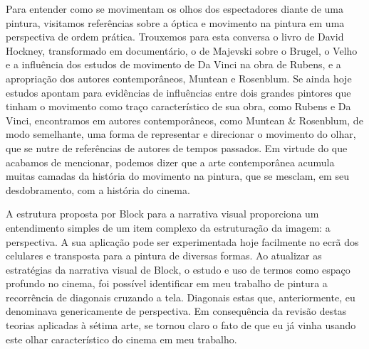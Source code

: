 Para entender como se movimentam os olhos dos espectadores diante de
uma pintura, visitamos referências sobre a óptica e movimento na
pintura em uma perspectiva de ordem prática. Trouxemos para esta
conversa o livro de David Hockney, transformado em documentário, o de
Majevski sobre o Brugel, o Velho e a influência dos estudos de
movimento de Da Vinci na obra de Rubens, e a apropriação dos autores
contemporâneos, Muntean e Rosenblum. Se ainda hoje estudos apontam para
evidências de influências entre dois grandes pintores que tinham o
movimento como traço característico de sua obra, como Rubens e Da
Vinci, encontramos em autores contemporâneos, como Muntean \& Rosenblum,
de modo semelhante, uma forma de representar e direcionar o movimento
do olhar, que se nutre de referências de autores de tempos passados. Em
virtude do que acabamos de mencionar, podemos dizer que a arte
contemporânea acumula muitas camadas da história do movimento na
pintura, que se mesclam, em seu desdobramento, com a história do
cinema.

A estrutura proposta por Block para a narrativa visual proporciona um
entendimento simples de um item complexo da estruturação da imagem: a
perspectiva. A sua aplicação pode ser experimentada hoje facilmente no
ecrã dos celulares e transposta para a pintura de diversas formas. Ao
atualizar as estratégias da narrativa visual de Block, o estudo e uso
de termos como espaço profundo no cinema, foi possível identificar em
meu trabalho de pintura a recorrência de diagonais cruzando a tela.
Diagonais estas que, anteriormente, eu denominava genericamente de
perspectiva. Em consequência da revisão destas teorias aplicadas à
sétima arte, se tornou claro o fato de que eu já vinha usando este
olhar característico do cinema em meu trabalho.

